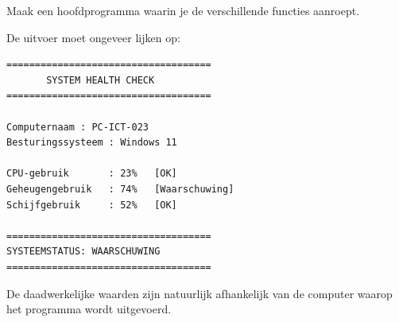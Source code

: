 Maak een hoofdprogramma waarin je de verschillende functies aanroept.

De uitvoer moet ongeveer lijken op:

\begin{verbatim}
====================================
       SYSTEM HEALTH CHECK
====================================

Computernaam : PC-ICT-023
Besturingssysteem : Windows 11

CPU-gebruik       : 23%   [OK]
Geheugengebruik   : 74%   [Waarschuwing]
Schijfgebruik     : 52%   [OK]

====================================
SYSTEEMSTATUS: WAARSCHUWING
====================================
\end{verbatim}

De daadwerkelijke waarden zijn natuurlijk afhankelijk van de computer waarop het programma wordt uitgevoerd.

